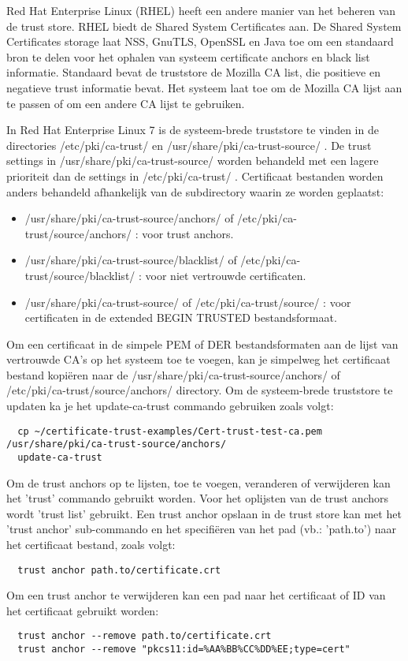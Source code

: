 Red Hat Enterprise Linux (RHEL) heeft een andere manier van het beheren van de trust store. RHEL biedt de Shared System Certificates aan.
De Shared System Certificates storage laat NSS, GnuTLS, OpenSSL en Java toe om een standaard bron te delen voor het ophalen van systeem certificate anchors en black list informatie.
Standaard bevat de truststore de Mozilla CA list, die positieve en negatieve trust informatie bevat. Het systeem laat toe om de Mozilla CA lijst aan te passen of om een andere CA lijst te gebruiken. \autocite{RHELtruststore} \break

In Red Hat Enterprise Linux 7 is de systeem-brede truststore te vinden in de directories /etc/pki/ca-trust/ en /usr/share/pki/ca-trust-source/ . De trust settings in /usr/share/pki/ca-trust-source/ worden behandeld met een lagere prioriteit dan de settings in /etc/pki/ca-trust/ .
Certificaat bestanden worden anders behandeld afhankelijk van de subdirectory waarin ze worden geplaatst:
\begin{itemize}
  \item /usr/share/pki/ca-trust-source/anchors/ of /etc/pki/ca-trust/source/anchors/ : voor trust anchors.
  \item /usr/share/pki/ca-trust-source/blacklist/ of /etc/pki/ca-trust/source/blacklist/ : voor niet vertrouwde certificaten.
  \item /usr/share/pki/ca-trust-source/ of /etc/pki/ca-trust/source/ : voor certificaten in de extended BEGIN TRUSTED bestandsformaat.
\end{itemize} \autocite{RHELtruststore}

Om een certificaat in de simpele PEM of DER bestandsformaten aan de lijst van vertrouwde CA's op het systeem toe te voegen, kan je simpelweg het certificaat bestand kopiëren naar de /usr/share/pki/ca-trust-source/anchors/ of /etc/pki/ca-trust/source/anchors/ directory. Om de systeem-brede truststore te updaten ka je het update-ca-trust commando gebruiken zoals volgt:
\begin{verbatim}
  cp ~/certificate-trust-examples/Cert-trust-test-ca.pem /usr/share/pki/ca-trust-source/anchors/
  update-ca-trust
\end{verbatim} 

Om de trust anchors op te lijsten, toe te voegen, veranderen of verwijderen kan het 'trust' commando gebruikt worden.
Voor het oplijsten van de trust anchors wordt 'trust list' gebruikt.
Een trust anchor opslaan in de trust store kan met het 'trust anchor' sub-commando en het specifiëren van het pad (vb.: 'path.to') naar het certificaat bestand, zoals volgt:
\begin{verbatim}
  trust anchor path.to/certificate.crt
\end{verbatim} 
Om een trust anchor te verwijderen kan een pad naar het certificaat of ID van het certificaat gebruikt worden:
\begin{verbatim}
  trust anchor --remove path.to/certificate.crt
  trust anchor --remove "pkcs11:id=%AA%BB%CC%DD%EE;type=cert"
\end{verbatim} 
\autocite{RHELtruststore} \break

